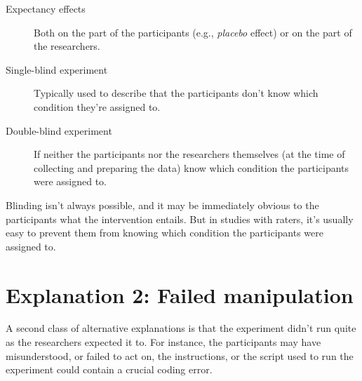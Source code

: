 \documentclass[a4paper]{tufte-book}\usepackage[]{graphicx}\usepackage[]{xcolor}
\begin{document}
\medskip

\begin{description}
 \item[Expectancy effects] Both
 on the part of the participants (e.g., \emph{placebo}
 effect) or on the part of the researchers.

 \item[Single-blind experiment] Typically used to describe
 that the participants don't know which condition they're assigned to.

 \item[Double-blind experiment] If neither the participants
 nor the researchers themselves (at the time of collecting and
 preparing the data) know which condition the participants were assigned
 to.
\end{description}

\medskip

Blinding isn't always possible, and it may be immediately obvious
to the participants what the intervention entails. But in studies
with raters, it's usually easy to prevent them from knowing
which condition the participants were assigned to.

\section{Explanation 2: Failed manipulation}
A second class of alternative explanations is that the experiment
didn't run quite as the researchers expected it to. For instance,
the participants may have misunderstood, or failed to act on, the instructions,
or the script used to run the experiment could contain a crucial coding error.

\medskip
\end{document}
